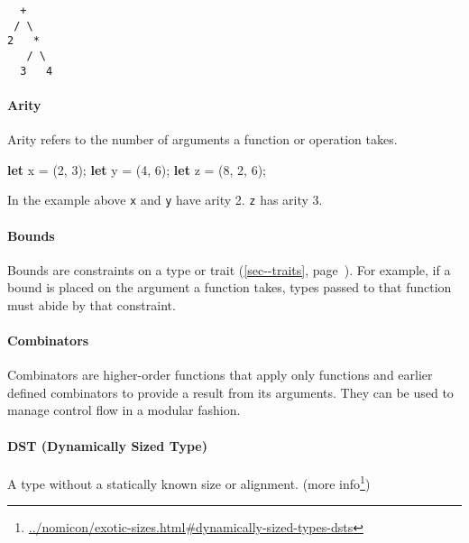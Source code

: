\documentclass[a4paper,]{book}
\renewcommand*{\hypertarget}[3][\ar]{%
  \def\ar{#2}%
  \label{#1}%
  #3}
\renewcommand*{\hyperlink}[2]{%
 #2 (\autoref{#1}, page~\pageref{#1})}
\newenvironment{Shaded}{\begin{snugshade}}{\end{snugshade}}
\newcommand{\KeywordTok}[1]{\textcolor[rgb]{0.13,0.29,0.53}{\textbf{{#1}}}}
\newcommand{\DecValTok}[1]{\textcolor[rgb]{0.00,0.00,0.81}{{#1}}}
\newcommand{\NormalTok}[1]{{#1}}
\renewcommand{\href}[2]{#2\footnote{\url{#1}}}
\let\oldparagraph\paragraph
\renewcommand{\paragraph}[1]{\oldparagraph{#1}\mbox{}}
\begin{document}
\begin{verbatim}
  +
 / \
2   *
   / \
  3   4
\end{verbatim}

\hypertarget{arity}{\paragraph{Arity}\label{arity}}

Arity refers to the number of arguments a function or operation takes.

\begin{Shaded}
\begin{Highlighting}[]
\KeywordTok{let} \NormalTok{x = (}\DecValTok{2}\NormalTok{, }\DecValTok{3}\NormalTok{);}
\KeywordTok{let} \NormalTok{y = (}\DecValTok{4}\NormalTok{, }\DecValTok{6}\NormalTok{);}
\KeywordTok{let} \NormalTok{z = (}\DecValTok{8}\NormalTok{, }\DecValTok{2}\NormalTok{, }\DecValTok{6}\NormalTok{);}
\end{Highlighting}
\end{Shaded}

In the example above \texttt{x} and \texttt{y} have arity 2. \texttt{z}
has arity 3.

\hypertarget{bounds}{\paragraph{Bounds}\label{bounds}}

Bounds are constraints on a type or
\protect\hyperlink{sec--traits}{trait}. For example, if a bound is
placed on the argument a function takes, types passed to that function
must abide by that constraint.

\paragraph{Combinators}\label{combinators}

Combinators are higher-order functions that apply only functions and
earlier defined combinators to provide a result from its arguments. They
can be used to manage control flow in a modular fashion.

\paragraph{DST (Dynamically Sized
Type)}\label{dst-dynamically-sized-type}

A type without a statically known size or alignment.
(\href{../nomicon/exotic-sizes.html\#dynamically-sized-types-dsts}{more
info})
\end{document}
